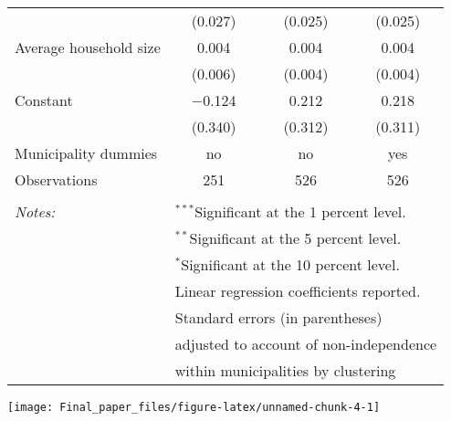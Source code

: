 \documentclass[]{elsarticle} %
\begin{document}
\begin{table}[!htbp]
\begin{tabular}{@{\extracolsep{0.3pt}}lccc}
  & (0.027) & (0.025) & (0.025) \\ 
  Average household size & 0.004 & 0.004 & 0.004 \\ 
  & (0.006) & (0.004) & (0.004) \\ 
  Constant & $-$0.124 & 0.212 & 0.218 \\ 
  & (0.340) & (0.312) & (0.311) \\ 
 Municipality dummies & no & no & yes \\ 
Observations & 251 & 526 & 526 \\ 
\hline \\[-1.8ex] 
\textit{Notes:} & \multicolumn{3}{l}{$^{***}$Significant at the 1 percent level.} \\ 
 & \multicolumn{3}{l}{$^{**}$Significant at the 5 percent level.} \\ 
 & \multicolumn{3}{l}{$^{*}$Significant at the 10 percent level.} \\ 
 & \multicolumn{3}{l}{Linear regression coefficients reported.} \\ 
 & \multicolumn{3}{l}{Standard errors (in parentheses)} \\ 
 & \multicolumn{3}{l}{adjusted to account of non-independence} \\ 
 & \multicolumn{3}{l}{within municipalities by clustering} \\ 
\end{tabular} 
\end{table}

\begin{center}\texttt{[image: Final\_paper\_files/figure-latex/unnamed-chunk-4-1]} \end{center}
\end{document}
